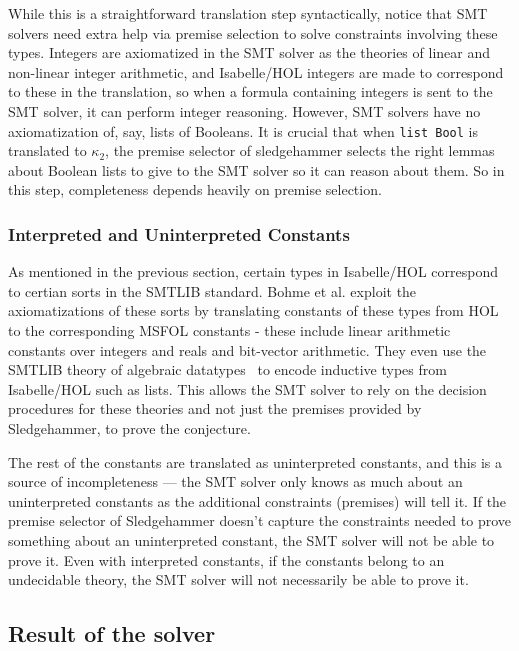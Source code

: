 \documentclass{article}
\begin{document}
	While this is a straightforward
	translation step syntactically, 
	notice that SMT solvers need 
	extra help via premise selection 
	to solve constraints involving 
	these types. Integers are 
	axiomatized in the SMT solver as 
	the theories of linear and 
	non-linear integer arithmetic, and 
	Isabelle/HOL integers are made to 
	correspond to these in the translation, 
	so when a formula containing 
	integers is sent to the SMT solver, 
	it can perform integer reasoning. 
	However, SMT solvers have no 
	axiomatization of, say, lists 
	of Booleans. It is crucial that when 
	\texttt{list Bool} is 
	translated to $\kappa_2$, the 
	premise selector of sledgehammer
	selects the right lemmas about 
	Boolean lists to give to the 
	SMT solver so it can reason 
	about them. So in this step, 
	completeness depends heavily on 
	premise selection.
	
	\subsubsection{Interpreted and Uninterpreted Constants}
	As mentioned in the previous section,
	certain types in Isabelle/HOL correspond
	to certian sorts in the SMTLIB standard.
	Bohme et al. exploit the axiomatizations 
	of these sorts by translating constants 
	of these types from HOL to the 
	corresponding MSFOL constants - these 
	include linear arithmetic constants over 
	integers and reals and bit-vector 
	arithmetic. They even use the SMTLIB 
	theory of algebraic 
	datatypes~\cite{BarST-PDPAR-06} to 
	encode inductive types from Isabelle/HOL
	such as lists. This allows the SMT solver
	to rely on the decision procedures for 
	these theories and not just the premises
	provided by Sledgehammer, to prove the 
	conjecture. 
	
	The rest of the constants are 
	translated as uninterpreted constants, 
	and this is a source of 
	incompleteness --- the SMT solver only 
	knows as much about an uninterpreted 
	constants as the additional constraints 
	(premises) will tell it. If the premise 
	selector of Sledgehammer doesn't capture 
	the constraints needed to prove something
	about an uninterpreted constant, the SMT 
	solver will not be able to prove it.
	Even with interpreted constants, if the 
	constants belong to an undecidable theory,
	the SMT solver will not necessarily be 
	able to prove it.
	
	\subsection{Result of the solver}
	
	
	
	
\end{document}
